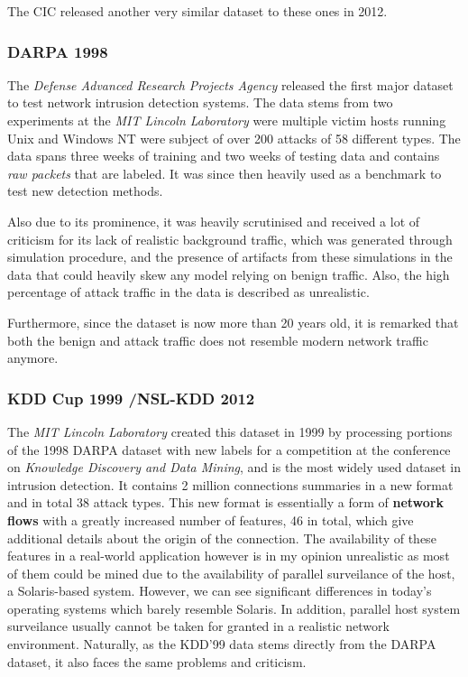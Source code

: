 The CIC released another very similar dataset to these ones in 2012.

\subsubsection*{DARPA 1998 \cite{lippmann2000evaluating}}

The \textit{Defense Advanced Research Projects Agency} released the first major dataset to test network intrusion detection systems. The data stems from two experiments at the \textit{MIT Lincoln Laboratory} were multiple victim hosts running Unix and Windows NT were subject of over 200 attacks of 58 different types. The data spans three weeks of training and two weeks of testing data and contains \textit{raw packets} that are labeled. It was since then heavily used as a benchmark to test new detection methods. %

Also due to its prominence, it was heavily scrutinised and received a lot of criticism for its lack of realistic background traffic, which was generated through simulation procedure, and the presence of artifacts from these simulations in the data that could heavily skew any model relying on benign traffic. Also, the high percentage of attack traffic in the data is described as unrealistic.

Furthermore, since the dataset is now more than 20 years old, it is remarked that both the benign and attack traffic does not resemble modern network traffic anymore. 

\subsubsection*{KDD Cup 1999 \cite{cup1999data,cup1999dataset}/NSL-KDD 2012 \cite{tavallaee2012nsl}}

The \textit{MIT Lincoln Laboratory} created this dataset in 1999 by processing portions of the 1998 DARPA dataset with new labels for a competition at the conference on \textit{Knowledge Discovery and Data Mining}, and is the most widely used dataset in intrusion detection. It contains 2 million connections summaries in a new format and in total 38 attack types. This new format is essentially a form of \textbf{network flows} with a greatly increased number of features, 46 in total, which give additional details about the origin of the connection. The availability of these features in a real-world application however is in my opinion unrealistic as most of them could be mined due to the availability of parallel surveilance of the host, a Solaris-based system. However, we can see significant differences in today's operating systems which barely resemble Solaris. In addition, parallel host system surveilance usually cannot be taken for granted in a realistic network environment. Naturally, as the KDD'99 data stems directly from the DARPA dataset, it also faces the same problems and criticism. 

